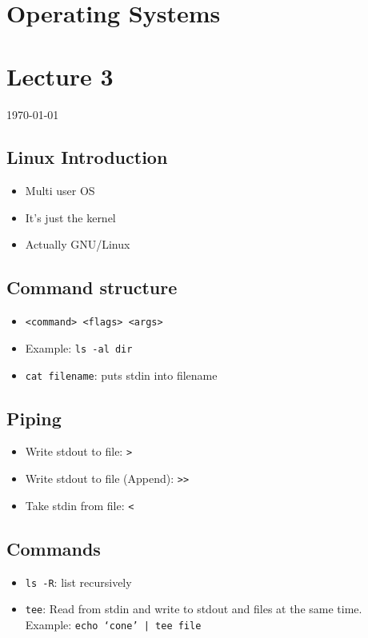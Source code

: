 \documentclass[12pt]{article}
\begin{document}
{\centering
\section*{Operating Systems}
\section*{Lecture 3}
\indent\today
}

\subsection*{Linux Introduction}
\begin{itemize}
    \item Multi user OS
    \item It's just the kernel
    \item Actually GNU/Linux
\end{itemize}
\subsection*{Command structure}
\begin{itemize}
    \item \texttt{<command> <flags> <args>}
    \item Example: \texttt{ls -al dir}
    \item \texttt{cat filename}: puts stdin into filename
\end{itemize}
\subsection*{Piping}
\begin{itemize}
    \item Write stdout to file: \texttt{>}
    \item Write stdout to file (Append): \texttt{>>}
    \item Take stdin from file: \texttt{<}
\end{itemize}
\subsection*{Commands}
\begin{itemize}
    \item \texttt{ls -R}: list recursively
    \item \texttt{tee}: Read from stdin and write to stdout and files at the same time. Example: \texttt{echo `cone' | tee file}
\end{itemize}
\end{document}
